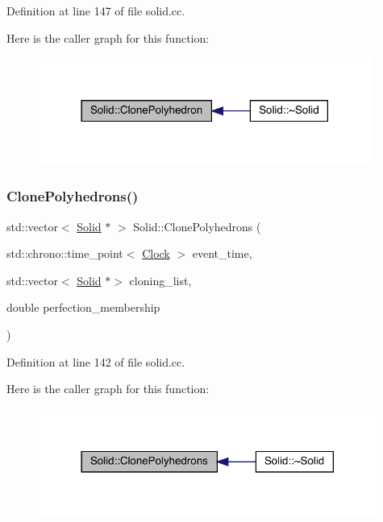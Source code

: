 Definition at line 147 of file solid.\+cc.

Here is the caller graph for this function\+:
\nopagebreak
\begin{figure}[H]
\begin{center}
\leavevmode
\includegraphics[width=309pt]{class_solid_ae83094e9c002a7574db242ed0bff6288_icgraph}
\end{center}
\end{figure}
\mbox{\label{class_solid_a1e650b6d8437acfaf7b9384b885d77bf}} 
\subsubsection{\texorpdfstring{Clone\+Polyhedrons()}{ClonePolyhedrons()}}
{\footnotesize\ttfamily std\+::vector$<$ \hyperlink{class_solid}{Solid} $\ast$ $>$ Solid\+::\+Clone\+Polyhedrons (\begin{DoxyParamCaption}\item[{std\+::chrono\+::time\+\_\+point$<$ \hyperlink{universe_8h_a0ef8d951d1ca5ab3cfaf7ab4c7a6fd80}{Clock} $>$}]{event\+\_\+time,  }\item[{std\+::vector$<$ \hyperlink{class_solid}{Solid} $\ast$$>$}]{cloning\+\_\+list,  }\item[{double}]{perfection\+\_\+membership }\end{DoxyParamCaption})}



Definition at line 142 of file solid.\+cc.

Here is the caller graph for this function\+:
\nopagebreak
\begin{figure}[H]
\begin{center}
\leavevmode
\includegraphics[width=314pt]{class_solid_a1e650b6d8437acfaf7b9384b885d77bf_icgraph}
\end{center}
\end{figure}
\mbox{\label{class_solid_a231b2c469aab60b092fcc3a9525e5c80}} 
